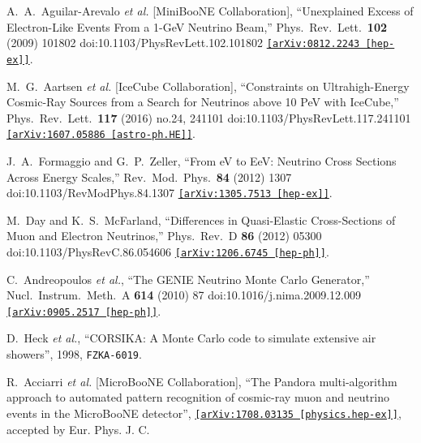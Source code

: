 \documentclass[a4paper]{article}
\begin{document}
\begin{thebibliography}{99}

  A.~A.~Aguilar-Arevalo {\emph{et al.}} [MiniBooNE Collaboration],
  ``Unexplained Excess of Electron-Like Events From a 1-GeV Neutrino Beam,''
  Phys.\ Rev.\ Lett.\  \textbf{102} (2009) 101802
  doi:10.1103/PhysRevLett.102.101802
  \href{https://arxiv.org/abs/0812.2243}{\texttt{[arXiv:0812.2243 [hep-ex]]}}.
  
  M.~G.~Aartsen {\emph{et al.}} [IceCube Collaboration],
  ``Constraints on Ultrahigh-Energy Cosmic-Ray Sources from a Search for Neutrinos above 10 PeV with IceCube,''
  Phys.\ Rev.\ Lett.\  \textbf{117} (2016) no.24,  241101
  doi:10.1103/PhysRevLett.117.241101
  \href{https://arxiv.org/abs/1607.05886}{\texttt{[arXiv:1607.05886 [astro-ph.HE]]}}.
  
  J.~A.~Formaggio and G.~P.~Zeller,
  ``From eV to EeV: Neutrino Cross Sections Across Energy Scales,''
  Rev.\ Mod.\ Phys.\  \textbf{84} (2012) 1307
  doi:10.1103/RevModPhys.84.1307
  \href{https://arxiv.org/abs/1305.7513}{\texttt{[arXiv:1305.7513 [hep-ex]]}}.
  
  
  M.~Day and K.~S.~McFarland,
  ``Differences in Quasi-Elastic Cross-Sections of Muon and Electron Neutrinos,''
  Phys.\ Rev.\ D \textbf{86} (2012) 05300 
  doi:10.1103/PhysRevC.86.054606
  \href{https://arxiv.org/abs/1206.6745}{\texttt{[arXiv:1206.6745 [hep-ph]]}}.
  
  C.~Andreopoulos \emph{et al.},
  ``The GENIE Neutrino Monte Carlo Generator,''
  Nucl.\ Instrum.\ Meth.\ A \textbf{ 614} (2010) 87
  doi:10.1016/j.nima.2009.12.009
  \href{https://arxiv.org/abs/0905.2517}{\texttt{[arXiv:0905.2517 [hep-ph]]}}.
  
   D.~Heck \emph{et al.},
  ``CORSIKA: A Monte Carlo code to simulate extensive air showers'', 1998,
  \texttt{FZKA-6019}.
  
     R.~Acciarri \emph{et al.} [MicroBooNE Collaboration], ``The Pandora multi-algorithm approach to automated pattern recognition of cosmic-ray muon and neutrino events in the MicroBooNE detector'', \href{https://arxiv.org/abs/1708.03135}{\texttt{[arXiv:1708.03135 [physics.hep-ex]]}}, accepted by Eur. Phys. J. C.
  

\end{thebibliography}
\end{document}
